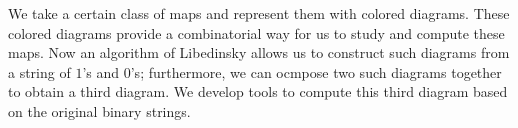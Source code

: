 
We take a certain class of maps and represent them with colored diagrams.  These colored diagrams provide a combinatorial way for us to study and compute these maps.  Now an algorithm of Libedinsky allows us to construct such diagrams from a string of $1$'s and $0$'s; furthermore, we can ocmpose two such diagrams together to obtain a third diagram.   We develop tools to compute this third diagram based on the original binary strings.

